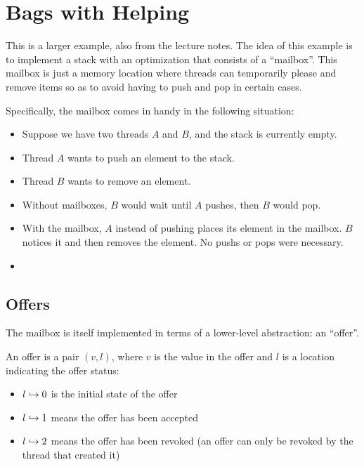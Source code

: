 \section{Bags with Helping}
\label{section:bags-with-helping}


This is a larger example, also from the lecture notes. The idea of this example is to implement a stack with an optimization that consists of a ``mailbox''. This mailbox is just a memory location where threads can temporarily please and remove items so as to avoid having to push and pop in certain cases.

Specifically, the mailbox comes in handy in the following situation:
\begin{itemize}
\item Suppose we have two threads $A$ and $B$, and the stack is currently empty.
\item Thread $A$ wants to push an element to the stack.
\item Thread $B$ wants to remove an element.
\item Without mailboxes, $B$ would wait until $A$ pushes, then $B$ would pop.
\item With the mailbox, $A$ instead of pushing places its element in the mailbox. $B$ notices it and then removes the element. No pushs or pops were necessary. 
\item {}
\end{itemize}

\subsection{Offers}

The mailbox is itself implemented in terms of a lower-level abstraction: an ``offer''.

An offer is a pair $(v, l)$, where $v$ is the value in the offer and $l$ is a location indicating the offer status:
\begin{itemize}
\item $l \hookrightarrow 0$ is the initial state of the offer
\item $l \hookrightarrow 1$ means the offer has been accepted
\item $l \hookrightarrow 2$ means the offer has been revoked (an offer can only be revoked by the thread that created it)
\end{itemize}

